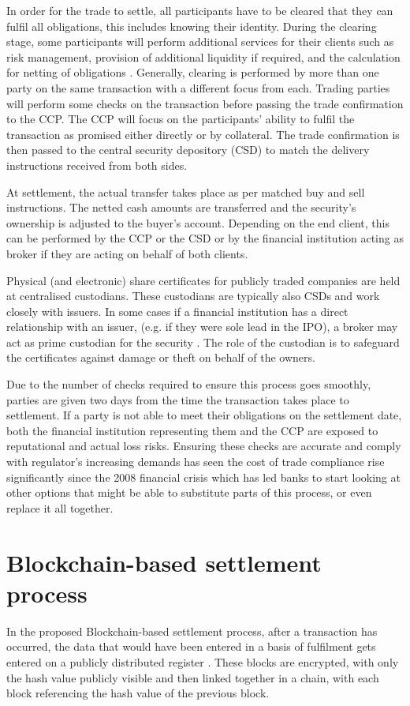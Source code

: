 \documentclass[pdftex]{article}
\begin{document}
In order for the trade to settle, all participants have to be cleared that they can fulfil all obligations, this includes knowing their identity. During the clearing stage, some participants will perform additional services for their clients such as risk management, provision of additional liquidity if required, and the calculation for netting of obligations \cite{CCP}. Generally, clearing is performed by more than one party on the same transaction with a different focus from each. Trading parties will perform some checks on the transaction before passing the trade confirmation to the CCP. The CCP will focus on the participants' ability to fulfil the transaction as promised either directly or by collateral. The trade confirmation is then passed to the central security depository (CSD) to match the delivery instructions received from both sides.

At settlement, the actual transfer takes place as per matched buy and sell instructions. The netted cash amounts are transferred and the security's ownership is adjusted to the buyer's account. Depending on the end client, this can be performed by the CCP or the CSD or by the financial institution acting as broker if they are acting on behalf of both clients.

Physical (and electronic) share certificates for publicly traded companies are held at centralised custodians. These custodians are typically also CSDs and work closely with issuers. In some cases if a financial institution has a direct relationship with an issuer, (e.g. if they were sole lead in the IPO), a broker may act as prime custodian for the security \cite{CCP}. The role of the custodian is to safeguard the certificates against damage or theft on behalf of the owners.

Due to the number of checks required to ensure this process goes smoothly, parties are given two days from the time the transaction takes place to settlement. If a party is not able to meet their obligations on the settlement date, both the financial institution representing them and the CCP are exposed to reputational and actual loss risks. Ensuring these checks are accurate and comply with regulator's increasing demands has seen the cost of trade compliance rise significantly \cite{TradeRisk} since the 2008 financial crisis which has led banks to start looking at other options that might be able to substitute parts of this process, or even replace it all together.


\section{Blockchain-based settlement process}
In the proposed Blockchain-based settlement process, after a transaction has occurred, the data that would have been entered in a basis of fulfilment gets entered on a publicly distributed register \cite{CaytasCU}. These blocks are encrypted, with only the hash value publicly visible and then linked together in a chain, with each block referencing the hash value of the previous block.
\end{document}
